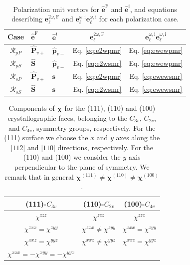 \begin{table}
\centering
\begin{tabular}{| c | l | l | c | c |}
\hline
Case               & $\hat{\mathbf{e}}^{\mathrm{F}}$
                   & $\hat{\mathbf{e}}^{\mathrm{i}}$
                   & $\mathbf{e}^{2\omega,\mathrm{F}}_{\ell}$
                   & $\mathbf{e}^{\omega,\mathrm{i}}_{\ell}
                      \mathbf{e}^{\omega,\mathrm{i}}_{\ell}$ \\
\hline
$\mathcal{R}_{pP}$ & $\hat{\mathbf{P}}_{v+}$
                   & $\hat{\mathbf{p}}_{v-}$
                   &  Eq. \eqref{eq:e2wpmr} & Eq. \eqref{eq:ewewpmr} \\
$\mathcal{R}_{pS}$ & $\hat{\mathbf{S}}$
                   & $\hat{\mathbf{p}}_{v-}$
                   &  Eq. \eqref{eq:e2wsmr} & Eq. \eqref{eq:ewewpmr} \\
$\mathcal{R}_{sP}$ & $\hat{\mathbf{P}}_{v+}$
                   & $\hat{\mathbf{s}}$
                   &  Eq. \eqref{eq:e2wpmr} & Eq. \eqref{eq:ewewsmr} \\
$\mathcal{R}_{sS}$ & $\hat{\mathbf{S}}$
                   & $\hat{\mathbf{s}}$
                   &  Eq. \eqref{eq:e2wsmr} & Eq. \eqref{eq:ewewsmr} \\
\hline
\end{tabular}
\caption{Polarization unit vectors for $\hat{\mathbf{e}}^{\mathrm{F}}$ and
$\hat{\mathbf{e}}^{\mathrm{i}}$, and equations describing
$\mathbf{e}^{2\omega,\mathrm{F}}_{\ell}$ and
$\mathbf{e}^{\omega,\mathrm{i}}_{\ell}\mathbf{e}^{\omega,\mathrm{i}}_{\ell}$ for
each polarization case.}
\label{tab:summary}
\end{table}

\begin{table}
\centering
\begin{tabular}{| c | c | c |}
\hline 
(111)-$C_{3v}$     & (110)-$C_{2v}$  & (100)-$C_{4v}$ \\
\hline 
$\chi^{zzz}$ & $\chi^{zzz}$ & $\chi^{zzz}$\\
$\chi^{zxx}=\chi^{zyy}$ & $\chi^{zxx}\ne\chi^{zyy}$ & $\chi^{zxx}=\chi^{zyy}$\\
$\chi^{xxz}=\chi^{yyz}$ & $\chi^{xxz}\ne\chi^{yyz}$ & $\chi^{xxz}=\chi^{yyz}$\\
$\chi^{xxx}=-\chi^{xyy}=-\chi^{yyx}$ & &  \\
\hline 
\end{tabular}
\caption{Components of $\boldsymbol{\chi}$ for the (111), (110) and (100)
crystallographic faces, belonging to the $C_{3v}$, $C_{2v}$, and $C_{4v}$,
symmetry groups, respectively. For the (111) surface we choose the $x$ and $y$
axes along the [$11\bar{2}$] and [$1\bar{1}0$] directions, respectively. For the
(110) and (100) we consider the $y$ axis perpendicular to the plane of
symmetry.\cite{sipePRB87} We remark that in general
$\boldsymbol{\chi}^{(111)}\ne \boldsymbol{\chi}^{(110)} \ne
\boldsymbol{\chi}^{(100)}$.}
\label{chis}
\end{table}


